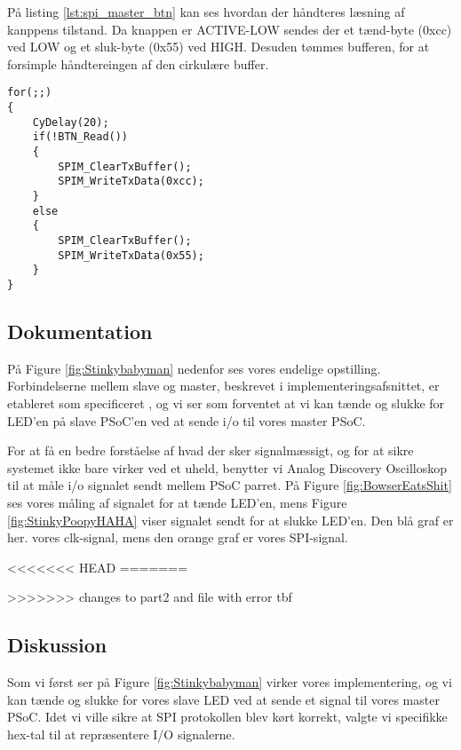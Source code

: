 \documentclass[../main.tex]{subfiles}
\begin{document}
På listing \ref{lst:spi_master_btn} kan ses hvordan der håndteres læsning af kanppens tilstand. Da knappen er ACTIVE-LOW sendes der et tænd-byte (0xcc) ved LOW og et sluk-byte (0x55) ved HIGH. Desuden tømmes bufferen, for at forsimple håndtereingen af den cirkulære buffer.

\begin{lstlisting}[caption={Håndtering af knappens input på SPI Master - med knap}, label=lst:spi_master_btn]
for(;;)
{
    CyDelay(20);
    if(!BTN_Read())
    {
        SPIM_ClearTxBuffer();
        SPIM_WriteTxData(0xcc); 
    }
    else
    {
        SPIM_ClearTxBuffer();
        SPIM_WriteTxData(0x55);
    }
}
\end{lstlisting}

\subsection{Dokumentation}
På Figure \ref{fig:Stinkybabyman} nedenfor ses vores endelige opstilling. Forbindelserne mellem slave og master, beskrevet i implementeringsafsnittet, er etableret som specificeret
, og vi ser som forventet at vi kan tænde og slukke for LED'en på slave PSoC'en ved at sende i/o til vores master PSoC.


For at få en bedre forståelse af hvad der sker signalmæssigt, og for at sikre systemet ikke bare virker ved et uheld, benytter vi Analog Discovery Oscilloskop til at måle  i/o signalet sendt mellem PSoC parret.
 På Figure \ref{fig:BowserEatsShit} ses vores måling af signalet for at tænde LED'en, mens Figure \ref{fig:StinkyPoopyHAHA} viser signalet sendt for at slukke LED'en. Den blå graf er her.
 vores clk-signal, mens den orange graf er vores SPI-signal. 

<<<<<<< HEAD
=======
 
>>>>>>> changes to part2 and file with error tbf
 
\subsection{Diskussion}
Som vi først ser på Figure \ref{fig:Stinkybabyman} virker vores implementering, og vi kan tænde og slukke for vores slave LED ved at sende et signal til vores master PSoC.
Idet vi ville sikre at SPI protokollen blev kørt korrekt, valgte vi specifikke hex-tal til at repræsentere I/O signalerne. 
\end{document}
